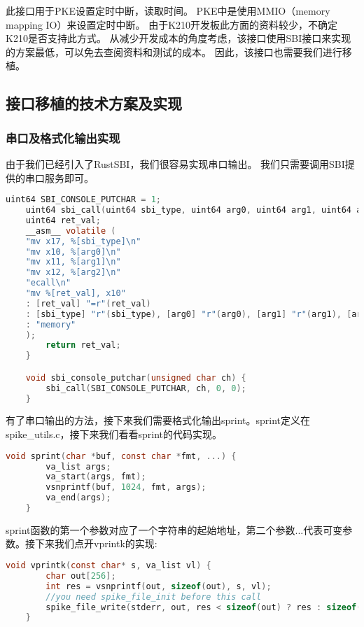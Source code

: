 此接口用于PKE设置定时中断，读取时间。
PKE中是使用MMIO（memory mapping IO）来设置定时中断。
由于K210开发板此方面的资料较少，不确定K210是否支持此方式。
从减少开发成本的角度考虑，该接口使用SBI接口来实现的方案最低，可以免去查阅资料和测试的成本。
因此，该接口也需要我们进行移植。

\subsection{接口移植的技术方案及实现}

\subsubsection{串口及格式化输出实现}

由于我们已经引入了RustSBI，我们很容易实现串口输出。
我们只需要调用SBI提供的串口服务即可。

\begin{lstlisting}[language=C, caption={串口实现代码}, label={lst:serial_output} ]
    uint64 SBI_CONSOLE_PUTCHAR = 1;
    uint64 sbi_call(uint64 sbi_type, uint64 arg0, uint64 arg1, uint64 arg2) {
    uint64 ret_val;
    __asm__ volatile (
    "mv x17, %[sbi_type]\n"
    "mv x10, %[arg0]\n"
    "mv x11, %[arg1]\n"
    "mv x12, %[arg2]\n"
    "ecall\n"
    "mv %[ret_val], x10"
    : [ret_val] "=r"(ret_val)
    : [sbi_type] "r"(sbi_type), [arg0] "r"(arg0), [arg1] "r"(arg1), [arg2] "r"(arg2)
    : "memory"
    );
        return ret_val;
    }

    void sbi_console_putchar(unsigned char ch) {
        sbi_call(SBI_CONSOLE_PUTCHAR, ch, 0, 0);
    }
\end{lstlisting}

有了串口输出的方法，接下来我们需要格式化输出sprint。sprint定义在spike\_utils.c，接下来我们看看sprint的代码实现。

\begin{lstlisting}[language=C, caption={sprint实现代码}, label={lst:sprint} ]
    void sprint(char *buf, const char *fmt, ...) {
        va_list args;
        va_start(args, fmt);
        vsnprintf(buf, 1024, fmt, args);
        va_end(args);
    }
\end{lstlisting}

sprint函数的第一个参数对应了一个字符串的起始地址，第二个参数...代表可变参数。接下来我们点开vprintk的实现:

\begin{lstlisting}[language=C, caption={vprintk实现代码}, label={lst:vprintk} ]
    void vprintk(const char* s, va_list vl) {
        char out[256];
        int res = vsnprintf(out, sizeof(out), s, vl);
        //you need spike_file_init before this call
        spike_file_write(stderr, out, res < sizeof(out) ? res : sizeof(out));
    }
\end{lstlisting}

